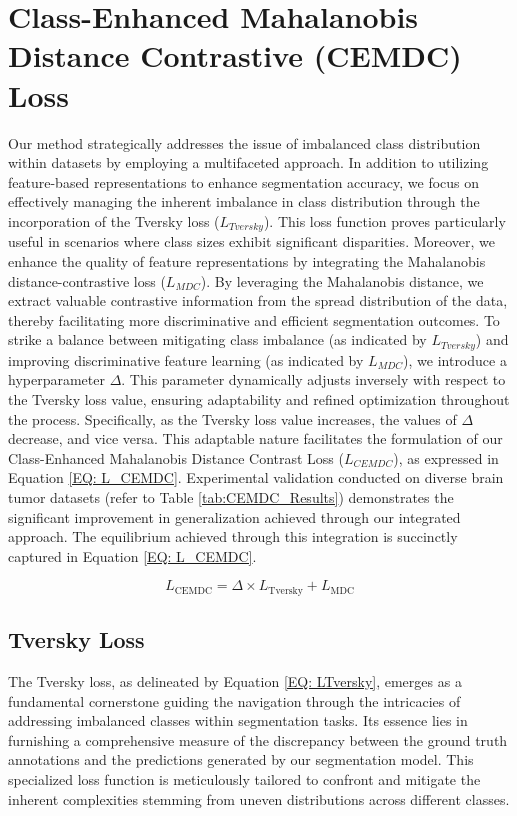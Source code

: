 \section{Class-Enhanced Mahalanobis Distance Contrastive (CEMDC) Loss}\label{sec:samdcapproach}
Our method strategically addresses the issue of imbalanced class distribution within datasets by employing a multifaceted approach. In addition to utilizing feature-based representations to enhance segmentation accuracy, we focus on effectively managing the inherent imbalance in class distribution through the incorporation of the Tversky loss (\(L_{Tversky}\)). This loss function proves particularly useful in scenarios where class sizes exhibit significant disparities. Moreover, we enhance the quality of feature representations by integrating the Mahalanobis distance-contrastive loss (\(L_{MDC}\)). By leveraging the Mahalanobis distance, we extract valuable contrastive information from the spread distribution of the data, thereby facilitating more discriminative and efficient segmentation outcomes. To strike a balance between mitigating class imbalance (as indicated by \(L_{Tversky}\)) and improving discriminative feature learning (as indicated by \(L_{MDC}\)), we introduce a hyperparameter \(\Delta\). This parameter dynamically adjusts inversely with respect to the Tversky loss value, ensuring adaptability and refined optimization throughout the process. Specifically, as the Tversky loss value increases, the values of \(\Delta\) decrease, and vice versa. This adaptable nature facilitates the formulation of our Class-Enhanced Mahalanobis Distance Contrast Loss (\(L_{CEMDC}\)), as expressed in Equation \ref{EQ: L_CEMDC}. Experimental validation conducted on diverse brain tumor datasets (refer to Table \ref{tab:CEMDC_Results}) demonstrates the significant improvement in generalization achieved through our integrated approach. The equilibrium achieved through this integration is succinctly captured in Equation \ref{EQ: L_CEMDC}.

\begin{equation} \label{EQ: L_CEMDC}
L_{\text{CEMDC}} = \Delta \times L_{\text{Tversky}} +  L_{\text{MDC}}
\end{equation}

\subsection{Tversky Loss}
The Tversky loss, as delineated by Equation \ref{EQ: LTversky}, emerges as a fundamental cornerstone guiding the navigation through the intricacies of addressing imbalanced classes within segmentation tasks. Its essence lies in furnishing a comprehensive measure of the discrepancy between the ground truth annotations and the predictions generated by our segmentation model. This specialized loss function is meticulously tailored to confront and mitigate the inherent complexities stemming from uneven distributions across different classes.

